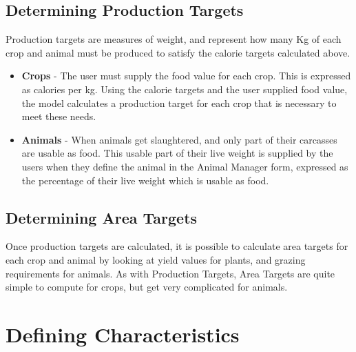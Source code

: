   \subsection{Determining Production Targets}
    Production targets are measures of weight, and represent how many Kg of each
    crop and animal must be produced to satisfy the calorie targets calculated
    above.
  \begin{itemize}
    \item \textbf{Crops} - The user must supply the food value for each crop. 
      This is expressed as calories per kg.  Using the calorie targets and the
      user supplied food value, the model calculates a production target for each
      crop that is necessary to meet these needs.
    \item \textbf{Animals} - When animals get slaughtered, and only part of
      their carcasses are usable as food.  This usable part of their live weight
      is supplied by the users when they define the animal in the Animal Manager
      form, expressed as the percentage of their live weight which is usable as food.
  \end{itemize}
  \subsection{Determining Area Targets}
  Once production targets are calculated, it is possible to calculate area
  targets for each crop and animal by looking at yield values for plants, and
  grazing requirements for animals.  As with Production Targets, Area Targets
  are quite simple to compute for crops, but get very complicated for animals.
\section{Defining Characteristics}
